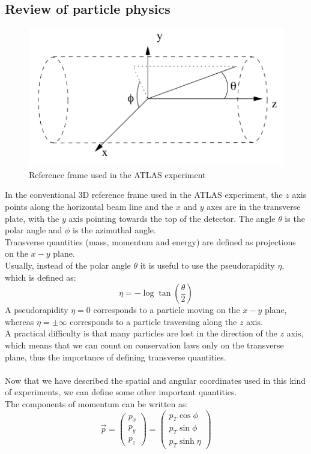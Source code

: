 \documentclass[12pt]{article}
\begin{document}
\subsection{Review of particle physics}
\begin{figure}
  \centering
  \includegraphics[scale=0.8]{img/atlas_frame.png}
  \caption{Reference frame used in the ATLAS experiment}
\end{figure}
In the conventional 3D reference frame used in the ATLAS experiment, the $z$ axis points along the horizontal 
beam line and the $x$ and $y$ axes are in the transverse plate, with the $y$ axis pointing towards the top 
of the detector. The angle $\theta$ is the polar angle and $\phi$ is the azimuthal angle. \\
Transverse quantities (mass, momentum and energy) are defined as projections on the $x-y$ plane. \\
Usually, instead of the polar angle $\theta$ it is useful to use the pseudorapidity $\eta$, which is defined
as:
\begin{equation}
  \eta = -\log \tan(\frac{\theta}{2})
\end{equation}
A pseudorapidity $\eta=0$ corresponds to a particle moving on the $x-y$ plane, whereas $\eta=\pm\infty$
corresponds to a particle traversing along the $z$ axis. \\
A practical difficulty is that many particles are lost in the direction of the $z$ axis, which means that we 
can count on conservation laws only on the transverse plane, thus the importance of defining transverse 
quantities. \\ \\
Now that we have described the spatial and angular coordinates used in this kind of experiments, we can 
define some other important quantities. \\
The components of momentum can be written as:
\begin{equation}
  \vec{p} = \begin{pmatrix}
	p_x \\
	p_y \\
	p_z
  \end{pmatrix} = \begin{pmatrix}
	p_T\cos\phi \\
	p_T\sin\phi \\
	p_T\sinh\eta
  \end{pmatrix}
\end{equation}
\end{document}
